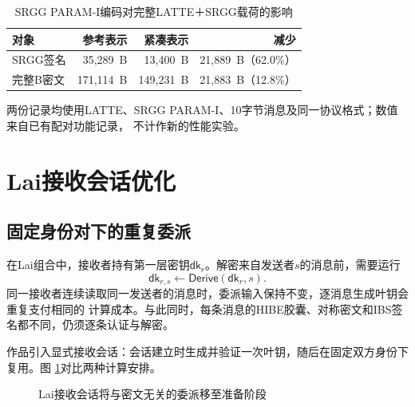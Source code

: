 \begin{table}[H]
\centering\small
\caption{SRGG PARAM-I编码对完整LATTE＋SRGG载荷的影响}
\label{tab:srgg-protocol-impact}
\begin{tabular}{@{}lrrr@{}}
\toprule
\rowcolor{black!8} 对象 & 参考表示 & 紧凑表示 & 减少 \\
\midrule
SRGG签名 & 35,289~B & 13,400~B & 21,889~B（62.0\%） \\
完整B密文 & 171,114~B & 149,231~B & 21,883~B（12.8\%） \\
\bottomrule
\end{tabular}
\begin{minipage}{.96\textwidth}\footnotesize
两份记录均使用LATTE、SRGG PARAM-I、10字节消息及同一协议格式；数值来自已有配对功能记录，
不计作新的性能实验。
\end{minipage}
\end{table}

\section{Lai接收会话优化}
\label{sec:lai-session}

\subsection{固定身份对下的重复委派}

在Lai组合中，接收者持有第一层密钥$\mathsf{dk}_r$。解密来自发送者$s$的消息前，需要运行
\[
 \mathsf{dk}_{r,s}\leftarrow\mathsf{Derive}(\mathsf{dk}_r,s).
\]
同一接收者连续读取同一发送者的消息时，委派输入保持不变，逐消息生成叶钥会重复支付相同的
计算成本。与此同时，每条消息的HIBE胶囊、对称密文和IBS签名都不同，仍须逐条认证与解密。

作品引入显式接收会话：会话建立时生成并验证一次叶钥，随后在固定双方身份下复用。图
\ref{fig:receiver-session}对比两种计算安排。

\begin{figure}[H]
\centering
{}
\caption{Lai接收会话将与密文无关的委派移至准备阶段}
\label{fig:receiver-session}
\end{figure}

